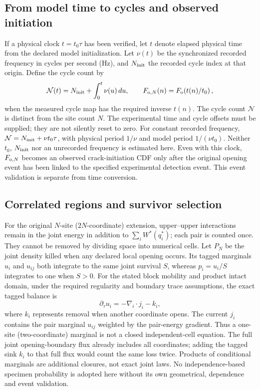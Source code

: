\documentclass[11pt]{article}
\begin{document}
\subsection{From model time to cycles and observed initiation}
If a physical clock $t=t_0\tau$ has been verified, let $t$ denote elapsed
physical time from the declared model initialization. Let $\nu(t)$ be the
synchronized recorded frequency in cycles per second (Hz), and $N_{\rm init}$
the recorded cycle index at that origin. Define the cycle count by
\begin{equation}
 \mathcal N(t)=N_{\rm init}+\int_0^t\nu(u)\,du,\qquad
 F_{{\rm o},N}(n)=F_{\rm o}\!\left(t(n)/t_0\right),
\end{equation}
when the measured cycle map has the required inverse $t(n)$.
The cycle count $\mathcal N$ is distinct from the site count $N$.
The experimental time and cycle offsets must be supplied; they are not
silently reset to zero. For constant recorded frequency,
$\mathcal N=N_{\rm init}+\nu t_0\tau$, with physical period $1/\nu$
and model period $1/(\nu t_0)$. Neither $t_0$, $N_{\rm init}$ nor an
unrecorded frequency is estimated here.
Even with this clock, $F_{{\rm o},N}$ becomes an observed crack-initiation CDF
only after the original opening event has been linked to the specified
experimental detection event. This event validation is separate from time conversion.

\subsection{Correlated regions and survivor selection}
For the original $N$-site ($2N$-coordinate) extension, upper--upper interactions remain in
the joint energy in addition to $\sum_iW^*(q_i^*)$; each pair is counted once.
They cannot be removed by dividing space into numerical cells.
Let $P_N$ be the joint density killed when any declared local opening occurs.
Its tagged marginals $u_i$ and $u_{ij}$ both integrate to the same joint survival
$S$, whereas $p_i=u_i/S$ integrates to one when $S>0$.
For the stated block mobility and product intact domain, under the required
regularity and boundary trace assumptions, the exact tagged balance is
\begin{equation}
 \partial_\tau u_i=-\nabla_i\!\cdot j_i-k_i,
\end{equation}
where $k_i$ represents removal when another coordinate opens. The current $j_i$
contains the pair marginal $u_{ij}$ weighted by the pair-energy gradient.
Thus a one-site (two-coordinate) marginal is not a closed independent-cell equation.
The full joint opening-boundary flux already includes all coordinates;
adding the tagged sink $k_i$ to that full flux would count the same loss twice.
Products of conditional marginals are additional closures, not exact joint laws.
No independence-based specimen probability is adopted here without its own
geometrical, dependence and event validation.
\end{document}

